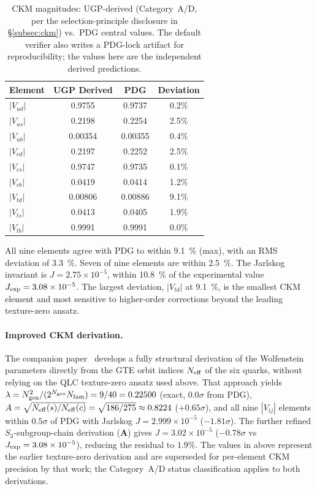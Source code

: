 \documentclass[11pt]{article}
\theoremstyle{remark}
\newcommand{\CatA}{\textbf{A}}
\begin{document}
\begin{table}[H]
\centering
\caption{CKM magnitudes: UGP-derived (Category~A/D, per the selection-principle disclosure in \S\ref{subsec:ckm}) vs.\ PDG central values.
The default verifier also writes a PDG-lock artifact for reproducibility; the values here are the independent derived predictions.}
\label{tab:ckm}
\renewcommand{\arraystretch}{1.1}
\small
\begin{tabular}{@{}l c c c@{}}
\toprule
\textbf{Element} & \textbf{UGP Derived} & \textbf{PDG} & \textbf{Deviation} \\
\midrule
$|V_{ud}|$ & 0.9755 & 0.9737 & 0.2\% \\
$|V_{us}|$ & 0.2198 & 0.2254 & 2.5\% \\
$|V_{ub}|$ & 0.00354 & 0.00355 & 0.4\% \\
$|V_{cd}|$ & 0.2197 & 0.2252 & 2.5\% \\
$|V_{cs}|$ & 0.9747 & 0.9735 & 0.1\% \\
$|V_{cb}|$ & 0.0419 & 0.0414 & 1.2\% \\
$|V_{td}|$ & 0.00806 & 0.00886 & 9.1\% \\
$|V_{ts}|$ & 0.0413 & 0.0405 & 1.9\% \\
$|V_{tb}|$ & 0.9991 & 0.9991 & 0.0\% \\
\bottomrule
\end{tabular}
\end{table}

\noindent All nine elements agree with PDG to within \SI{9.1}{\percent} (max), with an RMS deviation of \SI{3.3}{\percent}.
Seven of nine elements are within \SI{2.5}{\percent}.
The Jarlskog invariant is $J = 2.75 \times 10^{-5}$, within \SI{10.8}{\percent} of the experimental value $J_{\rm exp} = 3.08 \times 10^{-5}$.
The largest deviation, $|V_{td}|$ at \SI{9.1}{\percent}, is the smallest CKM element and most sensitive to higher-order corrections beyond the leading texture-zero ansatz.

\paragraph{Improved CKM derivation.}
The companion paper~\cite{SpivackCKM} develops a fully structural derivation of the Wolfenstein parameters directly from the GTE orbit indices $N_{\rm eff}$ of the six quarks, without relying on the QLC texture-zero ansatz used above.  That approach yields $\lambda = N_{\rm gen}^2/(2^{N_{\rm gen}} N_{\rm fam}) = 9/40 = 0.22500$ (exact, $0.0\sigma$ from PDG), $A = \sqrt{N_{\rm eff}(s)/N_{\rm eff}(c)} = \sqrt{186/275} \approx 0.8224$ ($+0.65\sigma$), and all nine $|V_{ij}|$ elements within $0.5\sigma$ of PDG with Jarlskog $J = 2.999 \times 10^{-5}$ ($-1.81\sigma$).  The further refined $S_3$-subgroup-chain derivation (\CatA) gives $J = 3.02 \times 10^{-5}$ ($-0.78\sigma$ vs $J_{\rm exp} = 3.08 \times 10^{-5}$), reducing the residual to $1.9\%$.
The values in  above represent the earlier texture-zero derivation and are superseded for per-element CKM precision by that work; the Category~A/D status classification applies to both derivations.
\end{document}

